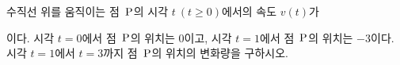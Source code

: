수직선 위를 움직이는 점~$\mathrm{P}$의 시각 $t\ (t\ge 0)$에서의 속도 $v(t)$가 \par\smallskip{}\par\smallskip\noindent 이다. 시각 $t=0$에서 점~$\mathrm{P}$의 위치는 $0$이고, 시각 $t=1$에서 점~$\mathrm{P}$의 위치는 $-3$이다. 시각 $t=1$에서 $t=3$까지 점~$\mathrm{P}$의 위치의 변화량을 구하시오. 
